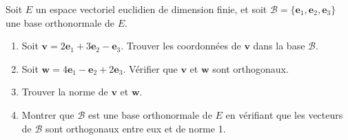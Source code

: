 \begin{exercice}
Soit \( E \) un espace vectoriel euclidien de dimension finie, et soit \( \mathcal{B} = \{ \mathbf{e}_1, \mathbf{e}_2, \mathbf{e}_3 \} \) une base orthonormale de \( E \).

\begin{enumerate}
    \item Soit \( \mathbf{v} = 2\mathbf{e}_1 + 3\mathbf{e}_2 - \mathbf{e}_3 \). Trouver les coordonnées de \( \mathbf{v} \) dans la base \( \mathcal{B} \).
    \item Soit \( \mathbf{w} = 4\mathbf{e}_1 - \mathbf{e}_2 + 2\mathbf{e}_3 \). Vérifier que \( \mathbf{v} \) et \( \mathbf{w} \) sont orthogonaux.
    \item Trouver la norme de \( \mathbf{v} \) et \( \mathbf{w} \).
    \item Montrer que \( \mathcal{B} \) est une base orthonormale de \( E \) en vérifiant que les vecteurs de \( \mathcal{B} \) sont orthogonaux entre eux et de norme 1.
\end{enumerate}
\end{exercice}

